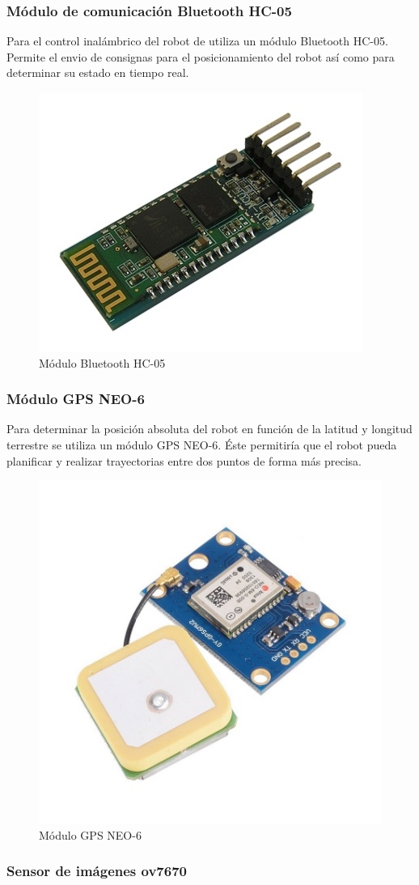 \documentclass{article}
\begin{document}
\subsubsection{Módulo de comunicación Bluetooth HC-05}

Para el control inalámbrico del robot de utiliza un módulo Bluetooth HC-05. Permite el envio de consignas para el posicionamiento del robot así como para determinar su estado en tiempo real.

\begin{figure}[!h]
  \centering
  \includegraphics[width=0.4\linewidth]{BLU.jpg}
  \caption{Módulo Bluetooth HC-05}
\end{figure}

\subsubsection{Módulo GPS NEO-6}

Para determinar la posición absoluta del robot en función de la latitud y longitud terrestre se utiliza un módulo GPS NEO-6. Éste permitiría que el robot pueda planificar y realizar trayectorias entre dos puntos de forma más precisa.

\begin{figure}[!h]
  \centering
  \includegraphics[width=0.4\linewidth]{GPS.jpg}
  \caption{Módulo GPS NEO-6}
\end{figure}

\subsubsection{Sensor de imágenes ov7670}
\end{document}

